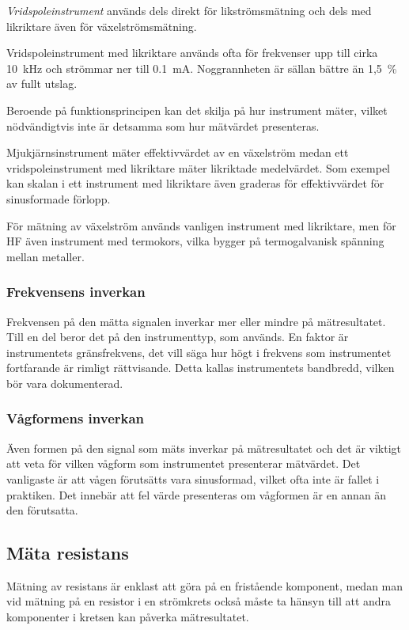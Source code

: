\emph{Vridspoleinstrument} används dels direkt för likströmsmätning
och dels med likriktare även för växelströmsmätning.

Vridspoleinstrument med likriktare används ofta för frekvenser upp
till cirka 10~kHz och strömmar ner till \SI{0,1}{\milli\ampere}.
Noggrannheten är sällan bättre än 1,5~\% av fullt utslag.

Beroende på funktionsprincipen kan det skilja på hur instrument mäter,
vilket nödvändigtvis inte är detsamma som hur mätvärdet presenteras.

Mjukjärnsinstrument mäter effektivvärdet av en växelström medan ett
vridspoleinstrument med likriktare mäter likriktade medelvärdet.
Som exempel kan skalan i ett instrument med likriktare även graderas för
effektivvärdet för sinusformade förlopp.

För mätning av växelström används vanligen instrument med likriktare,
men för HF även instrument med termokors, vilka bygger på
termogalvanisk spänning mellan metaller.

\subsubsection{Frekvensens inverkan}

Frekvensen på den mätta signalen inverkar mer eller mindre på mätresultatet.
Till en del beror det på den instrumenttyp, som används.
En faktor är instrumentets gränsfrekvens, det vill säga hur högt i frekvens som
instrumentet fortfarande är rimligt rättvisande.
Detta kallas instrumentets bandbredd, vilken bör vara dokumenterad.

\subsubsection{Vågformens inverkan}

Även formen på den signal som mäts inverkar på mätresultatet och det
är viktigt att veta för vilken vågform som instrumentet presenterar mätvärdet.
Det vanligaste är att vågen förutsätts vara sinusformad, vilket ofta inte är
fallet i praktiken.
Det innebär att fel värde presenteras om vågformen är en annan än den
förutsatta.

\subsection{Mäta resistans}

Mätning av resistans är enklast att göra på en fristående komponent,
medan man vid mätning på en resistor i en strömkrets också måste ta
hänsyn till att andra komponenter i kretsen kan påverka mätresultatet.

